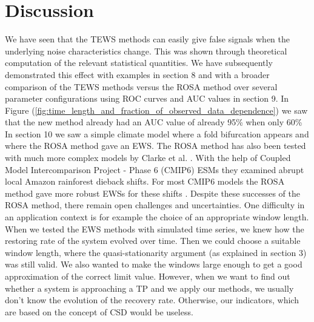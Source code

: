 \documentclass[%
thesis=student,%
coverpage=false,%
titlepage=false,%
headmarks=true, %
english,%
font=libertine, %
math=newpxtx, %
BCOR=5mm,%
coverBCOR=11mm%
]{tumbook}
\begin{document}
\chapter{Discussion}

We have seen that the TEWS methods can easily give false signals when the underlying noise characteristics change. This was shown through theoretical computation of the relevant statistical quantities. We have subsequently demonstrated this effect with examples in section 8 and with a broader comparison of the TEWS methods versus the ROSA method over several parameter configurations using ROC curves and AUC values in section 9. In Figure (\ref{fig:time_length_and_fraction_of_observed_data_dependence}) we saw that the new method already had an AUC value of already 95\% when only 60\% %
In section 10 we saw a simple climate model where a fold bifurcation appears and where the ROSA method gave an EWS. The ROSA method has also been tested with much more complex models by Clarke et al. \cite{Clarke:2023}. With the help of Coupled Model Intercomparison Project - Phase 6 (CMIP6) ESMs they examined abrupt local Amazon rainforest dieback shifts. For most CMIP6 models the ROSA method gave more robust EWSs for these shifts \cite{Clarke:2023}.
Despite these successes of the ROSA method, there remain open challenges and uncertainties. One difficulty in an application context is for example the choice of an appropriate window length. When we tested the EWS methods with simulated time series, we knew how the restoring rate of the system evolved over time. Then we could choose a suitable window length, where the quasi-stationarity argument (as explained in section 3) was still valid. We also wanted to make the windows large enough to get a good approximation of the correct limit value. However, when we want to find out whether a system is approaching a TP and we apply our methods, we usually don't know the evolution of the recovery rate. Otherwise, our indicators, which are based on the concept of CSD would be useless. 
\end{document}

